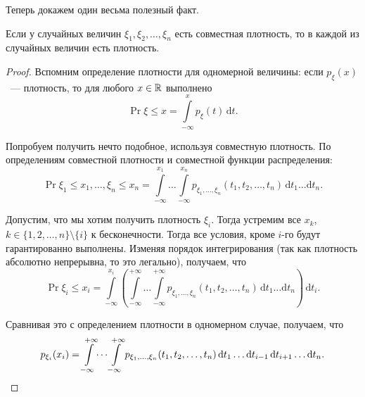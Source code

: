 Теперь докажем один весьма полезный факт.
\begin{theorem}
	Если у случайных величин \(\xi_1, \xi_2, \dots, \xi_n\) есть совместная плотность, то в каждой из случайных величин есть плотность.
\end{theorem}
\begin{proof}
	Вспомним определение плотности для одномерной величины: если \(p_{\xi}(x)\)~--- плотность, то для любого \(x \in \mathbb{R}\) выполнено
	\[
	\Pr{\xi \leq x} = \int\limits_{-\infty}^{x} p_{\xi}(t)\,\mathrm{d}t.
	\]
	
	Попробуем получить нечто подобное, используя совместную плотность. По определениям совместной плотности и совместной функции распределения:
	\[
	\Pr{\xi_1 \leq x_1, \dots, \xi_n \leq x_n} = \int\limits_{-\infty}^{x_1} \dots \int\limits_{-\infty}^{x_n} p_{\xi_1, \dots, \xi_n}(t_1, t_2, \dots, t_n)\,\mathrm{d}t_1\dots\mathrm{d}t_n.
	\]
	
	Допустим, что мы хотим получить плотность \(\xi_i\). Тогда устремим все \(x_k\), \(k \in \{1, 2, \dots, n\} \setminus \{i\}\) к бесконечности. Тогда все условия, кроме \(i\)-го будут гарантированно выполнены. Изменяя порядок интегрирования (так как плотность абсолютно непрерывна, то это легально), получаем, что
	\[
	\Pr{\xi_i \leq x_i} = \int\limits_{-\infty}^{x_i} \left(\int\limits_{-\infty}^{+\infty} \dots \int\limits_{-\infty}^{+\infty} p_{\xi_1, \dots, \xi_n}(t_1, t_2, \dots, t_n)\,\mathrm{d}t_1\dots\mathrm{d}t_n\right)\,\mathrm{d}t_i.
	\]
	
	Сравнивая это с определением плотности в одномерном случае, получаем, что
	\[
	p_{\xi_i}(x_i) = \int\limits_{-\infty}^{+\infty} \dots \int\limits_{-\infty}^{+\infty} p_{\xi_1, \dots, \xi_n}(t_1, t_2, \dots, t_n)\,\mathrm{d}t_1\dots\mathrm{d}t_{i - 1}\,\mathrm{d}t_{i + 1}\dots\mathrm{d}t_n.\qedhere
	\]
\end{proof}

